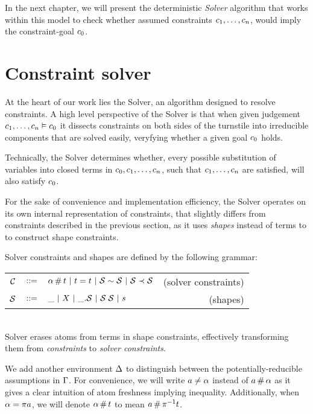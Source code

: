 \documentclass[english, mgr]{iithesis}
\renewcommand{\it}[1]{\textit{#1}}
\begin{document}
In the next chapter, we will present the deterministic \it{Solver} algorithm
that works within this model to check whether assumed constraints $c_1, \ldots, c_n$,
would imply the constraint-goal $c_0$.

\chapter{Constraint solver}
At the heart of our work lies the Solver, an algorithm designed to resolve constraints.
A high level perspective of the Solver is that when given judgement $c_1, \ldots, c_n \vDash c_0$ it dissects constraints on both sides of the turnstile into irreducible components that are solved easily, veryfying  whether a given goal $c_0$ holds.

Technically, the Solver determines whether,
every possible substitution of variables into closed terms in $c_0, c_1, \dots, c_n$,
such that $c_1, \dots, c_n$ are satisfied, will also satisfy $c_0$.

For the sake of convenience and implementation efficiency, the Solver operates
on its own internal representation of constraints, that slightly differs from
constraints described in the previous section,
as it uses \it{shapes} instead of terms to to construct shape constraints.

Solver constraints and shapes are defined by the following grammar: \\
\begin{tabular}{rclr}
  $\mathcal{C}$ & $::=$ & $\alpha \,\#\, t
  \ |\  t = t
  \ |\  \mathcal{S} \sim \mathcal{S}
  \ |\  \mathcal{S} \prec \mathcal{S}$
      & (solver constraints) \\
  $\mathcal{S}$      & $::=$ & $\_
                 \ |\   X
                 \ |\  \_. \mathcal{S}
                 \ |\  \mathcal{S} \; \mathcal{S}
                 \ |\  s$
      & (shapes)
\end{tabular}\\
Solver erases atoms from terms in shape constraints,
effectively transforming them from \it{constraints} to \it{solver constraints}.

We add another environment $\Delta$ to distinguish between the potentially-reducible assumptions in $\Gamma$.
For convenience, we will write $a \neq \alpha$ instead of $a \,\#\, \alpha$ as it gives a clear intuition of atom freshness implying inequality.
Additionally, when $\alpha = \pi a$, we will denote $\alpha \,\#\, t$ to mean $a \,\#\, \pi^{-1} t$.
\end{document}

